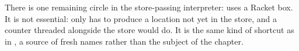 There is one remaining circle in the store-passing interpreter:  uses a Racket box. It is not essential:  only has to produce a location not yet in the store, and a counter threaded alongside the store would do. It is the same kind of shortcut as  in , a source of fresh names rather than the subject of the chapter.
